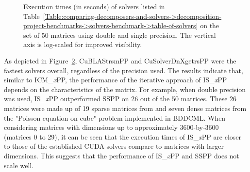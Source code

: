 \begin{figure}[ht!]
\begin{subfigure}{\textwidth}
		\label{Figure:comparing-decomposers-and-solvers->decomposition-project-benchmarks->solvers-benchmark->comparison-of-execution-times-on-all-matrices->single-precision}
	\end{subfigure}
	\caption{Execution times (in seconds) of solvers listed in Table~\ref{Table:comparing-decomposers-and-solvers->decomposition-project-benchmarks->solvers-benchmark->table-of-solvers} on the set of 50 matrices using double and single precision.
		The vertical axis is log-scaled for improved visibility.
	}
	\label{Figure:comparing-decomposers-and-solvers->decomposition-project-benchmarks->solvers-benchmark->comparison-of-execution-times-on-all-matrices->double-and-single-precision}
\end{figure}

As depicted in Figure~\ref{Figure:comparing-decomposers-and-solvers->decomposition-project-benchmarks->solvers-benchmark->comparison-of-execution-times-on-all-matrices->double-and-single-precision}, CuBLAStrsmPP and CuSolverDnXgetrsPP were the fastest solvers overall, regardless of the precision used.
The results indicate that, similar to ICM\_\textit{x}PP, the performance of the iterative approach of IS\_\textit{x}PP depends on the characteristics of the matrix.
For example, when double precision was used, IS\_\textit{x}PP outperformed SSPP on 26 out of the 50 matrices.
These 26 matrices were made up of 19 sparse matrices from  \cite{Davis2011} and seven dense matrices from the "Poisson equation on cube" problem implemented in BDDCML.
When considering matrices with dimensions up to approximately 3600-by-3600 (matrices 0 to 29), it can be seen that the execution times of IS\_\textit{x}PP are closer to those of the established CUDA solvers compare to matrices with larger dimensions.
This suggests that the performance of IS\_\textit{x}PP and SSPP does not scale well.

